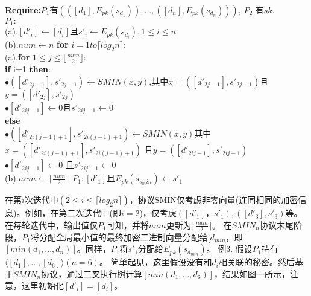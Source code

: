 \begin{algorithm}[htbp]
\small
\caption{$SMIN_n(([d_1],E_{pk}(s_{d_1})),...,([d_n],E_{pk}(s_{d_n})))\rightarrow ([d_min],E_{pk}(s_{d_{min}}))$}
\label{alg:algorithm2}
\begin{algorithmic}[1]
   \State \textbf{Require:}$P_1$有$(([d_1],E_{pk}(s_{d_1})),...,([d_n],E_{pk}(s_{d_n})))$, $P_2$ 有$sk$.\\
   \State $P_1:$\\
   \hspace{0.5cm}(a).$[d'_i] \leftarrow[d_i]$且$s'_i \leftarrow E_{pk}(s_{d_i}),1 \leq i \leq n$\\
   \hspace{0.5cm}(b).$num \leftarrow n$
   \State \textbf{for} $i=1 to \lceil log_2n\rceil$:\\
   \hspace{0.5cm}(a).\textbf{for} $1\leq j \leq \lfloor\frac{num}{2}\rfloor$:\\
   \hspace{1cm} \textbf{if} i=1 \textbf{then}:\\
   \hspace{1.5cm} $\bullet([d'_{2j-1}],s'_{2j-1})\leftarrow SMIN(x,y)$,其中$x=([d'_{2j-1}],s'_{2j-1})$且\\
   \hspace{1.8cm} $y=([d'_{2j}],s'_{2j})$\\
   \hspace{1.6cm}$\bullet[d'_{2ij-1}]\leftarrow 0$且$s'_{2ij-1} \leftarrow 0$\\
   \hspace{1cm} \textbf{else}\\
   \hspace{1.7cm}$\bullet([d'_{2i(j-1)+1}],s'_{2i(j-1)+1})\leftarrow SMIN(x,y)$其中\\
   \hspace{2cm}$x=([d'_{2i(j-1)+1}],s'_{2i(j-1)+1})$ 且$y=([d'_{2ij-1}],s'_{2ij-1})$\\
   \hspace{1.5cm} $\bullet[d'_{2ij-1}]\leftarrow 0$ 且$s'_{2ij-1}\leftarrow 0$\\
   \hspace{0.5cm}(b).$num \leftarrow \lceil\frac{num}{2}\rceil$
   \State $P_1:[d'_1]$且$E_{pk}(s_{s_min}) \leftarrow s'_1$
\end{algorithmic}
\end{algorithm}


在第$i$次迭代中$(2 \leq i \leq \lceil log_2n \rceil)$，协议SMIN仅考虑非零向量(连同相同的加密信息)。例如，在第二次迭代中(即$i=2$)，仅考虑$([d'_1]，s'_1),([d'_3],s'_3)$等。在每轮迭代中，输出值仅$P_1$可知，并将$num$更新为$\lceil \frac{num}{2} \rceil$。 在$SMIN_n$协议末尾阶段，$P_1$将分配全局最小值的最终加密二进制向量分配给$[d_{min}$，即$[min(d_1,...,d_n)]$。同样，$P_1$将$s'_1$分配给$E_{pk}(s_{d_{min}})$。
例3. 假设$P_1$持有$\langle [d_1],...,[d_6]\rangle (n=6)$。 简单起见，这里假设没有和$d_i$相关联的秘密。然后基于$SMIN_n$协议，通过二叉执行树计算$[min(d_1,...,d_6)]$，结果如图一所示，注意，这里初始化$[d'_i]=[d_i]$。

